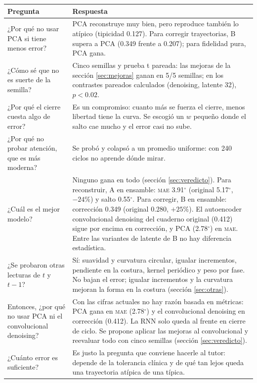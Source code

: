\documentclass[11pt,a4paper]{article}
\newcommand{\gr}{$^\circ$}
\newcommand{\mae}{\textsc{mae}}
\begin{document}
\begin{tabularx}{\textwidth}{@{}>{\raggedright\arraybackslash}p{5.2cm}X@{}}
\toprule
\textbf{Pregunta} & \textbf{Respuesta} \\
\midrule
¿Por qué no usar PCA si tiene menos error? & PCA reconstruye muy bien, pero reproduce también lo atípico (tipicidad 0.127). Para corregir trayectorias, B supera a PCA (0.349 frente a 0.207); para fidelidad pura, PCA gana. \\
¿Cómo sé que no es suerte de la semilla? & Cinco semillas y prueba t pareada: las mejoras de la sección \ref{sec:mejoras} ganan en 5/5 semillas; en los contrastes pareados calculados (denoising, latente 32), $p<0.02$. \\
¿Por qué el cierre cuesta algo de error? & Es un compromiso: cuanto más se fuerza el cierre, menos libertad tiene la curva. Se escogió un $w$ pequeño donde el salto cae mucho y el error casi no sube. \\
¿Por qué no probar atención, que es más moderna? & Se probó y colapsó a un promedio uniforme: con 240 ciclos no aprende dónde mirar. \\
¿Cuál es el mejor modelo? & Ninguno gana en todo (sección \ref{sec:veredicto}). Para reconstruir, A en ensamble: \mae{} 3.91\gr{} (original 5.17\gr, $-24\%$) y salto 0.55\gr. Para corregir, B en ensamble: corrección 0.349 (original 0.280, $+25\%$). El autoencoder convolucional denoising del cuaderno original (0.412) sigue por encima en corrección, y PCA (2.78\gr) en \mae{}. Entre las variantes de latente de B no hay diferencia estadística. \\
¿Se probaron otras lecturas de $t$ y $t-1$? & Sí: suavidad y curvatura circular, igualar incrementos, pendiente en la costura, kernel periódico y peso por fase. No bajan el error; igualar incrementos y la curvatura mejoran la forma en la costura (sección \ref{sec:otras}). \\
Entonces, ¿por qué no usar PCA ni el convolucional denoising? & Con las cifras actuales no hay razón basada en métricas: PCA gana en \mae{} (2.78\gr) y el convolucional denoising en corrección (0.412). La RNN solo queda al frente en cierre de ciclo. Se propone aplicar las mejoras al convolucional y reevaluar todo con cinco semillas (sección \ref{sec:veredicto}). \\
¿Cuánto error es suficiente? & Es justo la pregunta que conviene hacerle al tutor: depende de la tolerancia clínica y de qué tan lejos queda una trayectoria atípica de una típica. \\
\bottomrule
\end{tabularx}
\end{document}
